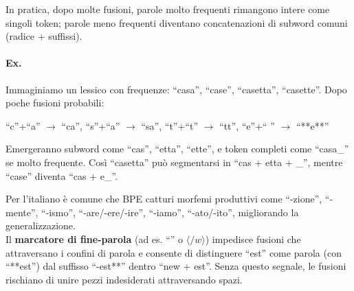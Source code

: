             In pratica, dopo molte fusioni, parole molto frequenti rimangono intere come singoli token; parole meno frequenti diventano concatenazioni di subword comuni (radice + suffissi).

            \paragraph{Ex.\\}
            Immaginiamo un lessico con frequenze: “casa”, “case”, “casetta”, “casette”. Dopo poche fusioni probabili:

            \begin{center}
                “c”+“a” $\to$ “ca”, “s”+“a” $\to$ “sa”, “t”+“t” $\to$ “tt”, “e”+“ ” $\to$ “**e**”
            \end{center}
            
            Emergeranno subword come “cas”, “etta”, “ette”, e token completi come “casa\_” se molto frequente.
            Così “casetta” può segmentarsi in “cas + etta + \_”, mentre “case” diventa “cas + e\_”. 
            
            Per l’italiano è comune che BPE catturi morfemi produttivi come “-zione”, “-mente”, “-ismo”, “-are/-ere/-ire”, “-iamo”, “-ato/-ito”, migliorando la generalizzazione.\\
            
            Il \textbf{marcatore di fine-parola} (ad es. “” o $\langle/\!w\rangle$) impedisce fusioni che attraversano i confini di parola e consente di distinguere “est” come parola (con “**est”) dal suffisso “-est**” dentro “new + est”. Senza questo segnale, le fusioni rischiano di unire pezzi indesiderati attraversando spazi.

